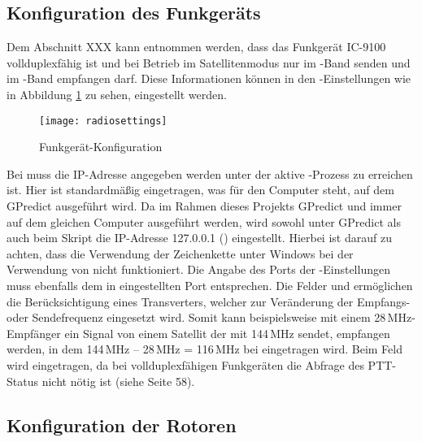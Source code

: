 \clearpage

\subsection{Konfiguration des Funkgeräts}
\label{chap:radioconfig}

Dem Abschnitt XXX kann entnommen werden, dass das Funkgerät IC-9100 vollduplexfähig ist und bei Betrieb im Satellitenmodus nur im -Band senden und im -Band empfangen darf. Diese Informationen können in den -Einstellungen wie in Abbildung \ref{fig:radioconfig} zu sehen, eingestellt werden. 

\begin{figure}[h]
	\centering
	\texttt{[image: radiosettings]}
	\caption{Funkgerät-Konfiguration}
	\label{fig:radioconfig} 
\end{figure}

Bei  muss die IP-Adresse angegeben werden unter der aktive -Prozess zu erreichen ist. Hier ist standardmäßig  eingetragen, was für den Computer steht, auf dem GPredict ausgeführt wird. Da im Rahmen dieses Projekts GPredict und  immer auf dem gleichen Computer ausgeführt werden, wird sowohl unter GPredict als auch beim Skript  die IP-Adresse 127.0.0.1 () eingestellt. Hierbei ist darauf zu achten, dass die Verwendung der Zeichenkette  unter Windows bei der Verwendung von  nicht funktioniert. Die Angabe des Ports der -Einstellungen muss ebenfalls dem in  eingestellten Port entsprechen. Die Felder  und  ermöglichen die Berücksichtigung eines Transverters, welcher zur Veränderung der Empfangs- oder Sendefrequenz eingesetzt wird. Somit kann beispielsweise mit einem 28\,MHz-Empfänger ein Signal von einem Satellit der mit 144\,MHz sendet, empfangen werden, in dem 144\,MHz -- 28\,MHz = 116\,MHz bei  eingetragen wird. Beim Feld  wird  eingetragen, da bei vollduplexfähigen Funkgeräten die Abfrage des \ac{PTT}-Status nicht nötig ist (siehe \cite{gpredictmanual} Seite 58).

\clearpage

\subsection{Konfiguration der Rotoren}
\label{chap:rotatorconfig}	

